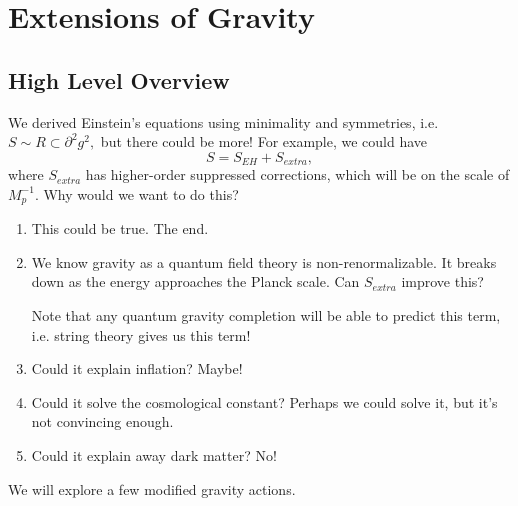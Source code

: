 \documentclass{article}
\numberwithin{equation}{section}
\begin{document}
\section{Extensions of Gravity}
\subsection{High Level Overview}
We derived Einstein's equations using minimality and symmetries, i.e. $S \sim R \subset \partial^2 g^2,$ but there could be more! For example, we could have 
\begin{equation*}
   S = S_{EH} + S_{extra},
\end{equation*}
where $S_{extra}$ has higher-order suppressed corrections, which will be on the scale of $M_p^{-1}.$ Why would we want to do this?
\begin{enumerate}
   \item This could be true. The end.
   \item We know gravity as a quantum field theory is non-renormalizable. It breaks down as the energy approaches the Planck scale. Can $S_{extra}$ improve this?
   
   Note that any quantum gravity completion will be able to predict this term, i.e. string theory gives us this term!
   \item Could it explain inflation? Maybe!
   \item Could it solve the cosmological constant? Perhaps we could solve it, but it's not convincing enough.
   \item Could it explain away dark matter? No!
\end{enumerate}
We will explore a few modified gravity actions.
\end{document}

